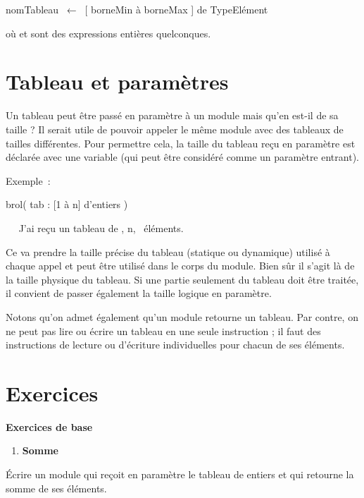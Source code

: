 {\sffamily
nomTableau~ ←\texttt{ } 
[ borneMin à borneMax ] de TypeElément}

{
où  et  sont des
expressions entières quelconques.}

\section{Tableau et paramètres}
{
Un tableau peut être passé en paramètre à un module mais qu’en est-il de
sa taille ? Il serait utile de pouvoir appeler le même module avec des
tableaux de tailles différentes. Pour permettre cela, la taille du
tableau reçu en paramètre est déclarée avec une variable (qui peut être
considéré comme un paramètre entrant). }

{
Exemple~:}

{\sffamily
{} brol( tab :  [1 à n]
d'entiers )}

{\sffamily
\ \  {\textquotedbl}J’ai reçu un tableau de
{\textquotedbl}, n, {\textquotedbl}~éléments.{\textquotedbl}}

{\sffamily
{} }

{
Ce  va prendre la taille précise du tableau
(statique ou dynamique) utilisé à chaque appel et peut être utilisé
dans le corps du module. Bien sûr il s’agit là de la taille physique du
tableau. Si une partie seulement du tableau doit être traitée, il
convient de passer également la taille logique en paramètre.}

{
Notons qu’on admet également qu’un module retourne un tableau. Par
contre, on ne peut pas lire ou écrire un tableau en une seule
instruction ; il faut des instructions de lecture ou
d'écriture individuelles pour chacun de ses éléments.}

\section{Exercices}
{\sffamily\bfseries
Exercices de base}

\liststyleExercice
\begin{enumerate}
\item {\sffamily\bfseries
Somme}
\end{enumerate}
{
Écrire un module qui reçoit en paramètre le tableau
 de  entiers et qui
retourne la somme de ses éléments.}

